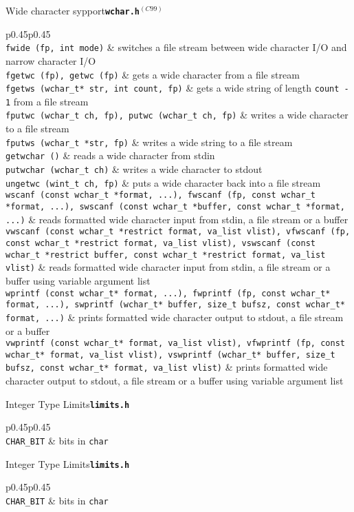 \documentclass{article}
\newcommand{\newstd}{\ensuremath{^{(C99)}}\xspace}
\newcommand{\librarysection}[5]{{\vspace{2ex}\large #1\quad\textbf{\texttt{#2}}}\par\begin{supertabular}{p{#3\linewidth}p{#4\linewidth}}#5\end{supertabular}}
\newcommand{\funcdescription}[2]{\texttt{#1} & #2 \\}
\newcommand{\smallheader}[1]{\multicolumn{2}{c}{#1} \\}
\begin{document}
\begin{multicols*}{3}
\librarysection{Wide character sypport}{wchar.h\newstd}{0.45}{0.45}{
\smallheader{\underline{Functions}}
\funcdescription{fwide (fp, int mode)}{switches a file stream between wide character I/O and narrow character I/O}
\funcdescription{fgetwc (fp), getwc (fp)}{gets a wide character from a file stream}
\funcdescription{fgetws (wchar\_t* str, int count, fp)}{gets a wide string of length \texttt{count - 1} from a file stream}
\funcdescription{fputwc (wchar\_t ch, fp), putwc (wchar\_t ch, fp)}{writes a wide character to a file stream}
\funcdescription{fputws (wchar\_t *str, fp)}{writes a wide string to a file stream}
\funcdescription{getwchar ()}{reads a wide character from stdin}
\funcdescription{putwchar (wchar\_t ch)}{writes a wide character to stdout}
\funcdescription{ungetwc (wint\_t ch, fp)}{puts a wide character back into a file stream}
\funcdescription{wscanf (const wchar\_t *format, ...), fwscanf (fp, const wchar\_t *format, ...), swscanf (const wchar\_t *buffer, const wchar\_t *format, ...)}{reads formatted wide character input from stdin, a file stream or a buffer}
\funcdescription{vwscanf (const wchar\_t *restrict format, va\_list vlist), vfwscanf (fp, const wchar\_t *restrict format, va\_list vlist), vswscanf (const wchar\_t *restrict buffer, const wchar\_t *restrict format, va\_list vlist)}{reads formatted wide character input from stdin, a file stream or a buffer using variable argument list}
\funcdescription{wprintf (const wchar\_t* format, ...), fwprintf (fp, const wchar\_t* format, ...), swprintf (wchar\_t* buffer, size\_t bufsz, const wchar\_t* format, ...)}{prints formatted wide character output to stdout, a file stream or a buffer}
\funcdescription{vwprintf (const wchar\_t* format, va\_list vlist), vfwprintf (fp, const wchar\_t* format, va\_list vlist), vswprintf (wchar\_t* buffer, size\_t bufsz, const wchar\_t* format, va\_list vlist)}{prints formatted wide character output to stdout, a file stream or a buffer using variable argument list}
}


\librarysection{Integer Type Limits}{limits.h}{0.45}{0.45}{
\smallheader{\underline{Functions}}
\funcdescription{CHAR\_BIT}{bits in \texttt{char}}
}

\librarysection{Integer Type Limits}{limits.h}{0.45}{0.45}{
\smallheader{\underline{Functions}}
\funcdescription{CHAR\_BIT}{bits in \texttt{char}}
}


\end{multicols*}
\end{document}
